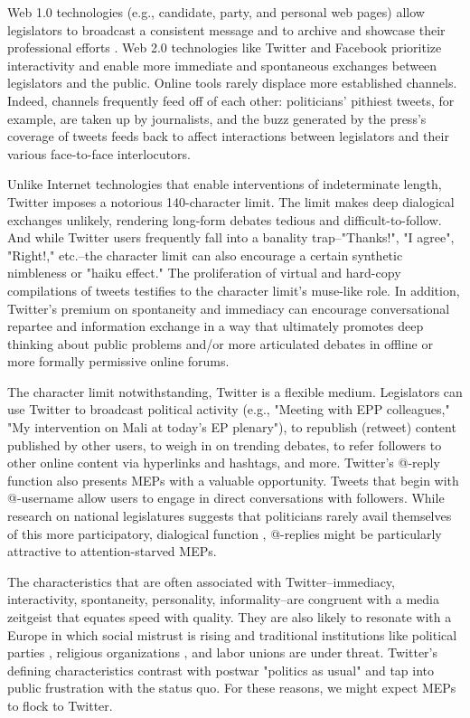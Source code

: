 \documentclass[12pt]{article}\usepackage[]{graphicx}\usepackage[]{color}
\begin{document}
		Web 1.0 technologies (e.g., candidate, party, and personal web pages) allow legislators to broadcast a consistent message and to archive and showcase their professional efforts \cite{adler.gent.overmeyer.1998}. Web 2.0 technologies like Twitter and Facebook prioritize interactivity and enable more immediate and spontaneous exchanges between legislators and the public. Online tools rarely displace more established channels. Indeed, channels frequently feed off of each other: politicians' pithiest tweets, for example, are taken up by journalists, and the buzz generated by the press's coverage of tweets feeds back to affect interactions between legislators and their various face-to-face interlocutors.
	 
		Unlike Internet technologies that enable interventions of indeterminate length, Twitter imposes a notorious 140-character limit. The limit makes deep dialogical exchanges unlikely, rendering long-form debates tedious and difficult-to-follow. And while Twitter users frequently fall into a banality trap--"Thanks!", "I agree", "Right!," etc.--the character limit can also encourage a certain synthetic nimbleness or "haiku effect." The proliferation of virtual and hard-copy compilations of tweets testifies to the character limit's muse-like role. In addition, Twitter's premium on spontaneity and immediacy can encourage conversational repartee and information exchange in a way that ultimately promotes deep thinking about public problems and/or more articulated debates in offline or more formally permissive online forums. 
	 
		The character limit notwithstanding, Twitter is a flexible medium. Legislators can use Twitter to broadcast political activity (e.g., "Meeting with EPP colleagues," "My intervention on Mali at today's EP plenary"), to republish (retweet) content published by other users, to weigh in on trending debates, to refer followers to other online content via hyperlinks and hashtags, and more. Twitter's @-reply function also presents MEPs with a valuable opportunity. Tweets that begin with @-username allow users to engage in direct conversations with followers. While research on national legislatures suggests that politicians rarely avail themselves of this more participatory, dialogical function \cite{shogan.2010}, @-replies might be particularly attractive to attention-starved MEPs.
	 
		The characteristics that are often associated with Twitter--immediacy, interactivity, spontaneity, personality, informality--are congruent with a media zeitgeist that equates speed with quality. They are also likely to resonate with a Europe in which social mistrust is rising \cite{dogan.2005, pharr.putnam.dalton.2000} and traditional institutions like political parties \cite{vanbiezen.poguntke.2014, vanbiezen.mair.poguntke.2012, whiteley.2011}, religious organizations \cite{burkimsher.2014, voas.2007, voas.2009}, and labor unions \cite{ebbinghaus.2002, vanbiezen.poguntke.2014} are under threat. Twitter's defining characteristics contrast with postwar "politics as usual" and tap into public frustration with the status quo. For these reasons, we might expect MEPs to flock to Twitter.
		
\end{document}
